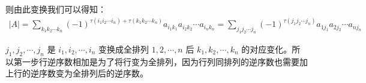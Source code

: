\documentclass[10pt, a4paper, oneside, UTF8]{ctexbook}
\begin{document}
则由此变换我们可以得知：
\begin{align}
  \left|A\right| = \sum\limits_{k_1k_2 \cdots
  k_n}^{}(-1)^{\tau(i_1i_2 \cdots i_n)+\tau(k_1k_2 \cdots
  k_n)}a_{i_1k_1}a_{i_2k_2}\cdots a_{i_nk_n} = \sum\limits_{j_1j_2
  \cdots j_n}^{}(-1)^{\tau(j_1j_2 \cdots j_n)}a_{1j_1}a_{2j_2}\cdots a_{nj_n}
\end{align}

$j_1,j_2,\cdots,j_n$ 是 $i_1,i_2,\cdots,i_n$ 变换成全排列 $1,2,\cdots,n$ 后
$k_1,k_2,\cdots,k_n$
的对应变化。所以第一步行逆序数相加是为了将行变为全排列，因为行列同排列的逆序数也需要加上行的逆序数变为全排列后的逆序数。
\end{document}
